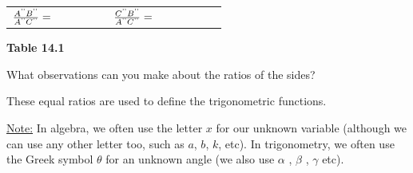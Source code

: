 {\begin{center}
\begin{xtabular*}{\mytablewidth}[t]{|p{10\mystarwidth}|p{10\mystarwidth}|p{10\mystarwidth}|}
                $\frac{{A}^{\text{'}\text{'}}{B}^{\text{'}\text{'}}}{{A}^{\text{'}\text{'}}{C}^{\text{'}\text{'}}}=\phantom{\rule{42.67912pt}{0ex}}$
               &
                $\frac{{C}^{\text{'}\text{'}}{B}^{\text{'}\text{'}}}{{A}^{\text{'}\text{'}}{C}^{\text{'}\text{'}}}=\phantom{\rule{42.67912pt}{0ex}}$
     \tabularnewline{}
    \end{xtabular*}
      \end{center}
    \begin{center}{\small\bfseries Table 14.1}\end{center}
        }%
    \par
      \label{m39405*id79075}What observations can you make about the ratios of the sides?\par 
      \label{m39405*id79081}These equal ratios are used to define the trigonometric functions.\par 
      \label{m39405*id79087}\uline{Note:} In algebra, we often use the letter $x$ for our unknown variable (although we can use any other letter too, such as $a$, $b$, $k$, etc). In trigonometry, we often use the Greek symbol $\theta $ for an unknown angle (we also use $\alpha $ , $\beta $ , $\gamma $ etc). \par 
  \label{m39405**end}
%     
%     
%     
    \label{m39408*cid5}
